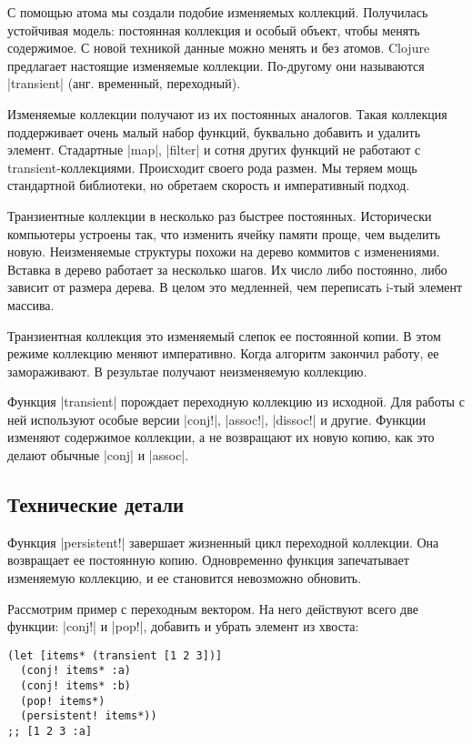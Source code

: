 С помощью атома мы создали подобие изменяемых коллекций. Получилась устойчивая
модель: постоянная коллекция и особый объект, чтобы менять содержимое. С новой
техникой данные можно менять и без атомов. Clojure предлагает настоящие
изменяемые коллекции. По-другому они называются \spverb|transient| (анг. временный,
переходный).

Изменяемые коллекции получают из их постоянных аналогов. Такая коллекция
поддерживает очень малый набор функций, буквально добавить и удалить
элемент. Стадартные \spverb|map|, \spverb|filter| и сотня других функций не работают с
transient-коллекциями. Происходит своего рода размен. Мы теряем мощь стандартной
библиотеки, но обретаем скорость и императивный подход.

Транзиентные коллекции в несколько раз быстрее постоянных. Исторически
компьютеры устроены так, что изменить ячейку памяти проще, чем выделить
новую. Неизменяемые структуры похожи на дерево коммитов с изменениями. Вставка в
дерево работает за несколько шагов. Их число либо постоянно, либо зависит от
размера дерева. В целом это медленней, чем переписать i-тый элемент массива.

Транзиентная коллекция это изменяемый слепок ее постоянной копии. В этом режиме
коллекцию меняют императивно. Когда алгоритм закончил работу, ее замораживают. В
результае получают неизменяемую коллекцию.

Функция \spverb|transient| порождает переходную коллекцию из исходной. Для работы с ней
используют особые версии \spverb|conj!|, \spverb|assoc!|, \spverb|dissoc!| и другие. Функции изменяют
содержимое коллекции, а не возвращают их новую копию, как это делают обычные
\spverb|conj| и \spverb|assoc|.

\subsection{Технические детали}

Функция \spverb|persistent!| завершает жизненный цикл переходной коллекции. Она
возвращает ее постоянную копию. Одновременно функция запечатывает изменяемую
коллекцию, и ее становится невозможно обновить.

Рассмотрим пример с переходным вектором. На него действуют всего две функции:
\spverb|conj!| и \spverb|pop!|, добавить и убрать элемент из хвоста:

\begin{verbatim}
(let [items* (transient [1 2 3])]
  (conj! items* :a)
  (conj! items* :b)
  (pop! items*)
  (persistent! items*))
;; [1 2 3 :a]
\end{verbatim}

